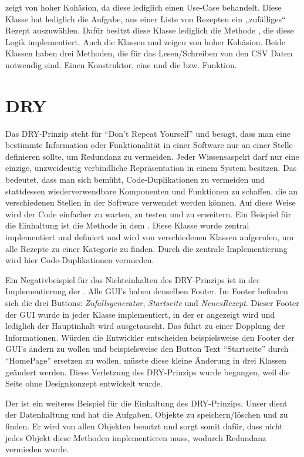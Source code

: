 \href{https://github.com/MichaelaHaag/RezeptApp/blob/main/1-Adapter/src/main/java/de/rezeptapp/adapter/GUIFunktionen/FunktionenZufallsGenerator.java}{} zeigt von hoher Kohäsion, da diese lediglich einen Use-Case behandelt. Diese Klasse hat lediglich die Aufgabe, aus einer Liste von Rezepten ein „zufälliges“ Rezept auszuwählen. Dafür besitzt diese Klasse lediglich die Methode , die diese Logik implementiert. Auch die Klassen  und  zeigen von hoher Kohäsion. Beide Klassen haben drei Methoden, die für das Lesen/Schreiben von den CSV Daten notwendig sind. Einen Konstruktor, eine  und die  bzw.  Funktion. 

\section{DRY}\label{DRY}
Das DRY-Prinzip steht für \enquote{Don't Repeat Yourself} und besagt, dass man eine bestimmte Information oder Funktionalität in einer Software nur an einer Stelle definieren sollte, um Redundanz zu vermeiden. Jeder Wissensaspekt darf nur eine einzige, unzweideutig verbindliche Repräsentation in einem
System besitzen. Das bedeutet, dass man sich bemüht, Code-Duplikationen zu vermeiden und stattdessen wiederverwendbare Komponenten und Funktionen zu schaffen, die an verschiedenen Stellen in der Software verwendet werden können. Auf diese Weise wird der Code einfacher zu warten, zu testen und zu erweitern.
Ein Beispiel für die Einhaltung ist die Methode  in dem . Diese Klasse wurde zentral implementiert und definiert und wird von verschiedenen Klassen aufgerufen, um alle Rezepte zu einer Kategorie zu finden. Durch die zentrale Implementierung wird hier Code-Duplikationen vermieden. 

Ein Negativbeispiel für das Nichteinhalten des DRY-Prinzips ist in der Implementierung der \href{https://github.com/MichaelaHaag/RezeptApp/blob/main/0-Plugins/src/main/java/de/rezeptapp/plugins/gui}{}. Alle GUI's haben denselben Footer. Im Footer befinden sich die drei Buttons: \emph{Zufallsgenerator}, \emph{Startseite} und \emph{NeuesRezept}. Dieser Footer der GUI wurde in jeder Klasse implementiert, in der er angezeigt wird und lediglich der Hauptinhalt wird ausgetauscht. Das führt zu einer Dopplung der Informationen. Würden die Entwickler entscheiden beispielsweise den Footer der GUI's ändern zu wollen und beispielsweise den Button Text \enquote{Startseite} durch \enquote{HomePage} ersetzen zu wollen, müsste diese kleine Änderung in drei Klassen geändert werden. Diese Verletzung des DRY-Prinzips wurde begangen, weil die Seite ohne Designkonzept entwickelt wurde.  

Der  ist ein weiteres Beispiel für die Einhaltung des DRY-Prinzips. Unser  dient der Datenhaltung und hat die Aufgaben, Objekte zu speichern/löschen und zu finden. Er wird von allen Objekten benutzt und sorgt somit dafür, dass nicht jedes Objekt diese Methoden implementieren muss, wodurch Redundanz vermieden wurde.

